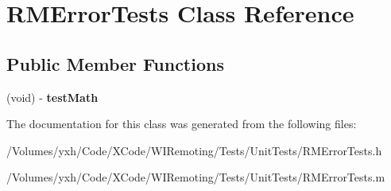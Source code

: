 \hypertarget{interface_r_m_error_tests}{
\section{RMErrorTests Class Reference}
\label{interface_r_m_error_tests}
}
\subsection*{Public Member Functions}
\begin{DoxyCompactItemize}
\item 
\hypertarget{interface_r_m_error_tests_a8810bd5d1039e6ee404a286f7b211f25}{
(void) -\/ {\bfseries testMath}}
\label{interface_r_m_error_tests_a8810bd5d1039e6ee404a286f7b211f25}

\end{DoxyCompactItemize}


The documentation for this class was generated from the following files:\begin{DoxyCompactItemize}
\item 
/Volumes/yxh/Code/XCode/WIRemoting/Tests/UnitTests/RMErrorTests.h\item 
/Volumes/yxh/Code/XCode/WIRemoting/Tests/UnitTests/RMErrorTests.m\end{DoxyCompactItemize}
